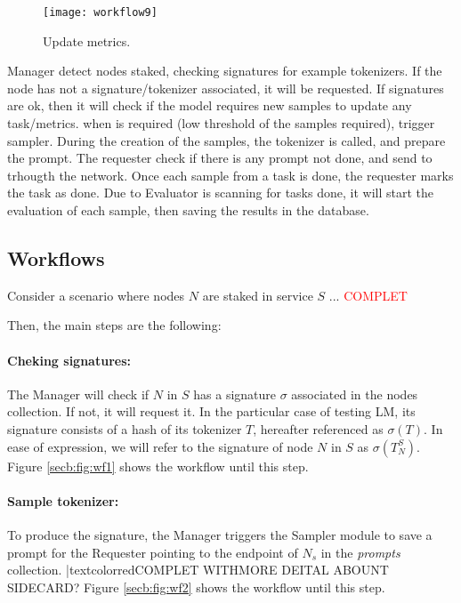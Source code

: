 \begin{figure}[htb!]
    \centering
    \texttt{[image: workflow9]}
    \caption{Update metrics.}
    \label{secb:fig:wf9}
\end{figure}

Manager detect nodes staked, checking signatures for example tokenizers. If the node has not a signature/tokenizer associated, it will be requested. 
If signatures are ok, then it will check if the model requires new samples to update any task/metrics. 
when is required (low threshold of the samples required), trigger sampler. 
During the creation of the samples, the tokenizer is called, and prepare the prompt. 
The requester check if there is any prompt not done, and send to trhougth the network. 
Once each sample from a task is done, the requester marks the task as done. 
Due to Evaluator is scanning for tasks done, it will start the evaluation of each sample, then saving the results in the database. 

\subsection{Workflows}

Consider a scenario where nodes $N$ are staked in service $S$ ... \textcolor{red}{COMPLET}

Then, the main steps are the following:

\paragraph{Cheking signatures:}
The Manager will check if $N$ in $S$ has a signature $\sigma$ associated in the nodes collection. 
If not, it will request it. 
In the particular case of testing \gls{LM}, its signature consists of a hash of its tokenizer $T$, hereafter referenced as $\sigma(T)$. 
In ease of expression, we will refer to the signature of node $N$ in $S$ as $\sigma(T_{N}^{S})$. 
Figure \ref{secb:fig:wf1} shows the workflow until this step.


\paragraph{Sample tokenizer:}
To produce the signature, the Manager triggers the Sampler module to save a prompt for the Requester pointing to the endpoint of $N_s$ in the \textit{prompts} collection. |textcolor{red}{COMPLET WITHMORE DEITAL ABOUNT SIDECARD?}
Figure \ref{secb:fig:wf2} shows the workflow until this step.


